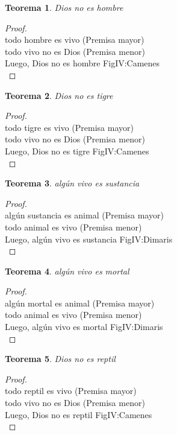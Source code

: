 ﻿\documentclass[12pt]{book}
\newtheorem{theorem}{Teorema}[chapter]
\newtheorem{proof}{Demostración}
\begin{document}
\begin{theorem}
Dios no es hombre
\label{th: 87}
\end{theorem}\begin{proof}\\todo hombre es vivo	 (Premisa mayor) \\todo vivo no es Dios	 (Premisa menor) \\Luego, Dios no es hombre	FigIV:Camenes \\ \end{proof}
\begin{theorem}
Dios no es tigre
\label{th: 88}
\end{theorem}\begin{proof}\\todo tigre es vivo	 (Premisa mayor) \\todo vivo no es Dios	 (Premisa menor) \\Luego, Dios no es tigre	FigIV:Camenes \\ \end{proof}
\begin{theorem}
algún vivo es sustancia
\label{th: 89}
\end{theorem}\begin{proof}\\algún sustancia es animal	 (Premisa mayor) \\todo animal es vivo	 (Premisa menor) \\Luego, algún vivo es sustancia	FigIV:Dimaris \\ \end{proof}
\begin{theorem}
algún vivo es mortal
\label{th: 90}
\end{theorem}\begin{proof}\\algún mortal es animal	 (Premisa mayor) \\todo animal es vivo	 (Premisa menor) \\Luego, algún vivo es mortal	FigIV:Dimaris \\ \end{proof}
\begin{theorem}
Dios no es reptil
\label{th: 91}
\end{theorem}\begin{proof}\\todo reptil es vivo	 (Premisa mayor) \\todo vivo no es Dios	 (Premisa menor) \\Luego, Dios no es reptil	FigIV:Camenes \\ \end{proof}
\end{document}
